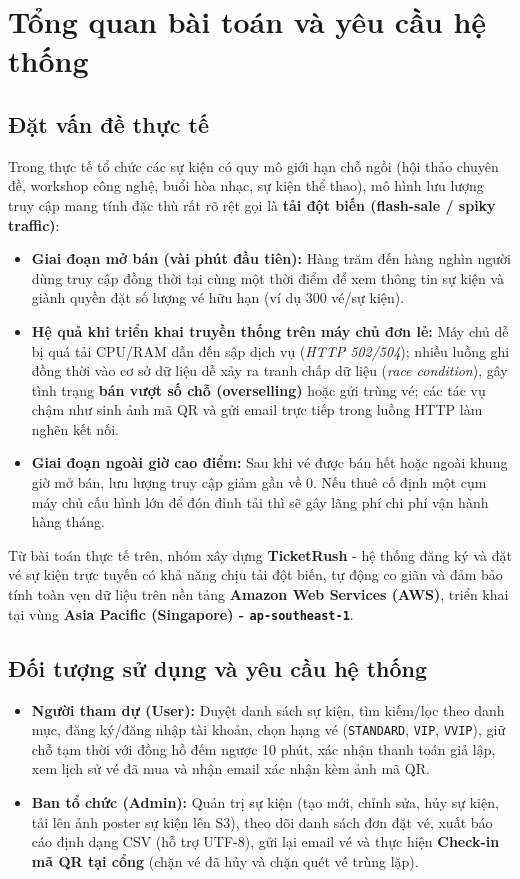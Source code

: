 \chapter[Tổng quan bài toán và yêu cầu]{Tổng quan bài toán và yêu cầu hệ thống}

\section{Đặt vấn đề thực tế}
Trong thực tế tổ chức các sự kiện có quy mô giới hạn chỗ ngồi (hội thảo chuyên đề, workshop công nghệ, buổi hòa nhạc, sự kiện thể thao), mô hình lưu lượng truy cập mang tính đặc thù rất rõ rệt gọi là \textbf{tải đột biến (flash-sale / spiky traffic)}:
\begin{itemize}[leftmargin=1.5em]
  \item \textbf{Giai đoạn mở bán (vài phút đầu tiên):} Hàng trăm đến hàng nghìn người dùng truy cập đồng thời tại cùng một thời điểm để xem thông tin sự kiện và giành quyền đặt số lượng vé hữu hạn (ví dụ 300 vé/sự kiện).
  \item \textbf{Hệ quả khi triển khai truyền thống trên máy chủ đơn lẻ:} Máy chủ dễ bị quá tải CPU/RAM dẫn đến sập dịch vụ (\textit{HTTP 502/504}); nhiều luồng ghi đồng thời vào cơ sở dữ liệu dễ xảy ra tranh chấp dữ liệu (\textit{race condition}), gây tình trạng \textbf{bán vượt số chỗ (overselling)} hoặc gửi trùng vé; các tác vụ chậm như sinh ảnh mã QR và gửi email trực tiếp trong luồng HTTP làm nghẽn kết nối.
  \item \textbf{Giai đoạn ngoài giờ cao điểm:} Sau khi vé được bán hết hoặc ngoài khung giờ mở bán, lưu lượng truy cập giảm gần về 0. Nếu thuê cố định một cụm máy chủ cấu hình lớn để đón đỉnh tải thì sẽ gây lãng phí chi phí vận hành hàng tháng.
\end{itemize}

Từ bài toán thực tế trên, nhóm xây dựng \textbf{TicketRush} - hệ thống đăng ký và đặt vé sự kiện trực tuyến có khả năng chịu tải đột biến, tự động co giãn và đảm bảo tính toàn vẹn dữ liệu trên nền tảng \textbf{Amazon Web Services (AWS)}, triển khai tại vùng \textbf{Asia Pacific (Singapore) - \texttt{ap-southeast-1}}.

\section{Đối tượng sử dụng và yêu cầu hệ thống}
\begin{itemize}[leftmargin=1.5em]
  \item \textbf{Người tham dự (User):} Duyệt danh sách sự kiện, tìm kiếm/lọc theo danh mục, đăng ký/đăng nhập tài khoản, chọn hạng vé (\texttt{STANDARD}, \texttt{VIP}, \texttt{VVIP}), giữ chỗ tạm thời với đồng hồ đếm ngược 10 phút, xác nhận thanh toán giả lập, xem lịch sử vé đã mua và nhận email xác nhận kèm ảnh mã QR.
  \item \textbf{Ban tổ chức (Admin):} Quản trị sự kiện (tạo mới, chỉnh sửa, hủy sự kiện, tải lên ảnh poster sự kiện lên S3), theo dõi danh sách đơn đặt vé, xuất báo cáo định dạng CSV (hỗ trợ UTF-8), gửi lại email vé và thực hiện \textbf{Check-in mã QR tại cổng} (chặn vé đã hủy và chặn quét vé trùng lặp).
\end{itemize}

